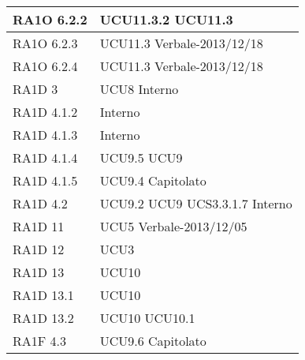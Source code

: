 \begin{center}
\begin{longtable}{ | p{5cm} | p{5cm} |}
        RA1O 6.2.2 &  UCU11.3.2 \newline  UCU11.3 \newline  \\ \hline      
        RA1O 6.2.3 &  UCU11.3 \newline  Verbale-2013/12/18 \newline  \\ \hline      
        RA1O 6.2.4 &  UCU11.3 \newline  Verbale-2013/12/18 \newline  \\ \hline      
        RA1D 3  &  UCU8 \newline  Interno \newline  \\ \hline      
        RA1D 4.1.2  &  Interno \newline  \\ \hline      
        RA1D 4.1.3  &  Interno \newline  \\ \hline      
        RA1D 4.1.4  &  UCU9.5 \newline  UCU9 \newline  \\ \hline      
        RA1D 4.1.5 &  UCU9.4 \newline  Capitolato \newline  \\ \hline      
        RA1D 4.2  &  UCU9.2 \newline  UCU9 \newline  UCS3.3.1.7 \newline  Interno \newline  \\ \hline      
        RA1D 11 &  UCU5 \newline  Verbale-2013/12/05 \newline  \\ \hline      
        RA1D 12 &  UCU3 \newline  \\ \hline      
        RA1D 13 &  UCU10 \newline  \\ \hline      
        RA1D 13.1 &  UCU10 \newline  \\ \hline      
        RA1D 13.2 &  UCU10 \newline  UCU10.1 \newline  \\ \hline      
        RA1F 4.3 &  UCU9.6 \newline  Capitolato \newline  \\ \hline      

\end{longtable}
\end{center}
